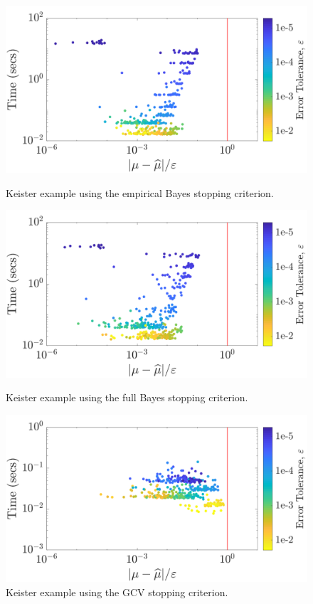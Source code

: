 \documentclass{svjour3}                     %
\begin{document}
\begin{figure}
	\centering
	\includegraphics[width=0.95\linewidth]{"Lattice_Keister_guaranteed_time_MLE_C1sin_d4_r2_2019-Jun-27"}
	\caption[Keister guaranteed:MLE]{Keister example using the empirical Bayes stopping criterion.}
	\label{fig:keister-guaranteed-MLE}
	\centering
	\includegraphics[width=0.95\linewidth]{"Lattice_Keister_guaranteed_time_full_C1sin_d4_r2_2019-Jun-27"}
	\caption[Keister guaranteed:FB]{Keister example using the full Bayes stopping criterion.}
	\label{fig:keister-guaranteed-FB}
	\centering
	\includegraphics[width=0.95\linewidth]{"Lattice_Keister_guaranteed_time_GCV_C1sin_d4_r2_2019-Jun-27"}
	\caption[Keister guaranteed:GCV]{Keister example using the GCV stopping criterion.}
	\label{fig:keister-guaranteed-GCV}
\end{figure}
\end{document}
